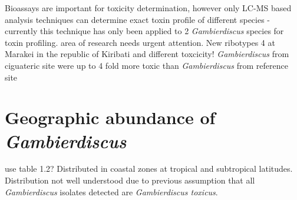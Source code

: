 \documentclass[12pt]{article}
\begin{document}
Bioassays are important for toxicity determination, however only LC-MS based analysis techniques can determine exact toxin profile of different species - currently this technique has only been applied to 2 \emph{Gambierdiscus} species for toxin profiling. area of research needs urgent attention.
New ribotypes 4  at Marakei in the republic of Kiribati and different toxcicity! \emph{Gambierdiscus} from ciguateric site were up to 4 \- fold more toxic than \emph{Gambierdiscus} from reference site \cite{xu2014distribution}

\section{Geographic abundance of \emph{Gambierdiscus}}
use table 1.2?
Distributed in coastal zones at tropical and subtropical latitudes.
Distribution not well understood due to previous assumption that all \emph{Gambierdiscus} isolates detected are \emph{Gambierdiscus toxicus}.
\end{document}
